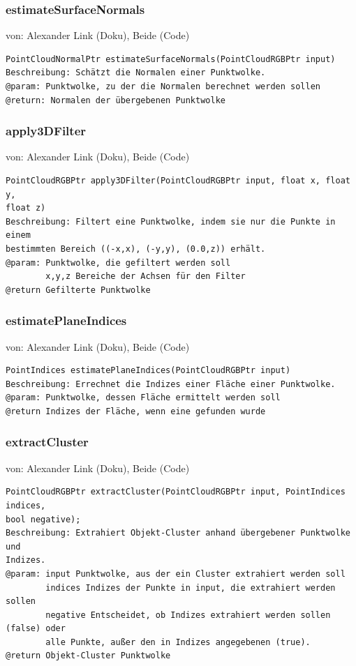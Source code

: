 \documentclass{suturo}
\makeatletter
\newcommand{\chapterauthor}[1]{%
  {\parindent0pt\vspace*{-27pt}%
  \linespread{0}\small\begin{flushright}von: #1\end{flushright}%
  \par\nobreak\vspace*{0pt}}
  \@afterheading%
}
\makeatother
\begin{document}
\subsubsection{estimateSurfaceNormals}
\chapterauthor{Alexander Link (Doku), Beide (Code)}
\begin{verbatim}
PointCloudNormalPtr estimateSurfaceNormals(PointCloudRGBPtr input)
Beschreibung: Schätzt die Normalen einer Punktwolke.
@param: Punktwolke, zu der die Normalen berechnet werden sollen
@return: Normalen der übergebenen Punktwolke
\end{verbatim}\label{func:estimatesurfacenormals}

\subsubsection{apply3DFilter}
\chapterauthor{Alexander Link (Doku), Beide (Code)}
\begin{verbatim}
PointCloudRGBPtr apply3DFilter(PointCloudRGBPtr input, float x, float y, 
float z)
Beschreibung: Filtert eine Punktwolke, indem sie nur die Punkte in einem
bestimmten Bereich ((-x,x), (-y,y), (0.0,z)) erhält.
@param: Punktwolke, die gefiltert werden soll
		x,y,z Bereiche der Achsen für den Filter
@return Gefilterte Punktwolke
\end{verbatim}\label{func:apply3dfilter}

\subsubsection{estimatePlaneIndices}
\chapterauthor{Alexander Link (Doku), Beide (Code)}
\begin{verbatim}
PointIndices estimatePlaneIndices(PointCloudRGBPtr input)
Beschreibung: Errechnet die Indizes einer Fläche einer Punktwolke.
@param: Punktwolke, dessen Fläche ermittelt werden soll
@return Indizes der Fläche, wenn eine gefunden wurde
\end{verbatim}\label{func:estimateplaneindices}

\subsubsection{extractCluster}
\chapterauthor{Alexander Link (Doku), Beide (Code)}
\begin{verbatim}
PointCloudRGBPtr extractCluster(PointCloudRGBPtr input, PointIndices indices, 
bool negative);
Beschreibung: Extrahiert Objekt-Cluster anhand übergebener Punktwolke und
Indizes.
@param: input Punktwolke, aus der ein Cluster extrahiert werden soll
		indices Indizes der Punkte in input, die extrahiert werden sollen
		negative Entscheidet, ob Indizes extrahiert werden sollen (false) oder
		alle Punkte, außer den in Indizes angegebenen (true).
@return Objekt-Cluster Punktwolke
\end{verbatim}\label{func:extractcluster}
\end{document}
